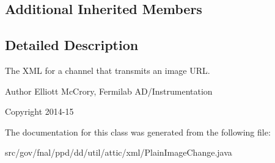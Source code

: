 \subsection*{Additional Inherited Members}


\subsection{Detailed Description}
The X\-M\-L for a channel that transmits an image U\-R\-L.

\begin{DoxyAuthor}{Author}
Elliott Mc\-Crory, Fermilab A\-D/\-Instrumentation 
\end{DoxyAuthor}
\begin{DoxyCopyright}{Copyright}
2014-\/15 
\end{DoxyCopyright}


The documentation for this class was generated from the following file\-:\begin{DoxyCompactItemize}
\item 
src/gov/fnal/ppd/dd/util/attic/xml/Plain\-Image\-Change.\-java\end{DoxyCompactItemize}
